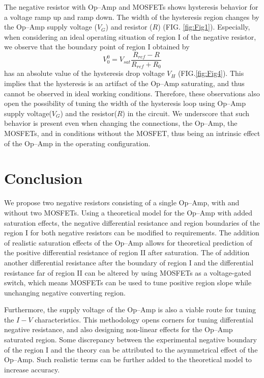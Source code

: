 \documentclass[%
 aip,
amsmath,amssymb,
reprint,
]{revtex4-1}
\begin{document}
The negative resistor with Op--Amp and MOSFETs shows hysteresis behavior for a voltage ramp up and ramp down. The width of the hysteresis region changes by the Op--Amp supply voltage ($V_G$) and resistor ($R$) (FIG. \ref{fig:Fig1}). Especially, when considering an ideal operating situation of region I of the negative resistor, we observe that the boundary point of region I obtained by 
\begin{equation}
    V_0^0 = V_{sat}\frac{R_{ref}-R}{R_{ref}+R_0}
\end{equation}
has an absolute value of the hysteresis drop voltage $V_H$ (FIG.\ref{fig:Fig4}). This implies that the hysteresis is an artifact of the Op--Amp saturating, and thus cannot be observed in ideal working conditions. Therefore, these observations also open the possibility of tuning the width of the hysteresis loop using Op--Amp supply voltage($V_G$) and the resistor($R$) in the circuit. We underscore that such behavior is present even when changing the connections, the Op--Amp, the MOSFETs, and in conditions without the MOSFET, thus being an intrinsic effect of the Op--Amp in the operating configuration. 




\section{\label{sec:Conclusion} Conclusion}
We propose two negative resistors consisting of a single Op--Amp, with and without two MOSFETs. Using a theoretical model for the Op--Amp with added saturation effects, the negative differential resistance and region boundaries of the region I for both negative resistors can be modified to requirements. The addition of realistic saturation effects of the Op--Amp allows for theoretical prediction of the positive differential resistance of region II after saturation. The of addition another differential resistance after the boundary of region I and the differential resistance far of region II can be altered by using MOSFETs as a voltage-gated switch, which means MOSFETs can be used to tune positive region slope while unchanging negative converting region. 

Furthermore, the supply voltage of the Op--Amp is also a viable route for tuning the $I-V$ characteristics. This methodology opens corners for tuning differential negative resistance, and also designing non-linear effects for the Op--Amp saturated region. Some discrepancy between the experimental negative boundary of the region I and the theory can be attributed to the asymmetrical effect of the Op--Amp. Such realistic terms can be further added to the theoretical model to increase accuracy.\\
\end{document}
